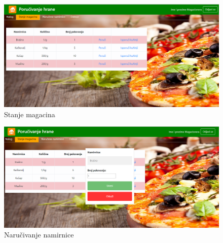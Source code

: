  \begin{figure}[!h]
    \leavevmode
    \begin{center}
    \includegraphics[width=1\textwidth]{slike/magacioner_stanjeMagacina.PNG}
    \end{center}
    \caption{Stanje magacina} %
    \label{fig:slika8}
\end{figure}

 \begin{figure}[!h]
    \leavevmode
    \begin{center}
    \includegraphics[width=1\textwidth]{slike/magacioner_Narucivanje.PNG}
    \end{center}
    \caption{Naručivanje namirnice} %
    \label{fig:slika8}
\end{figure}
 
 \newpage
